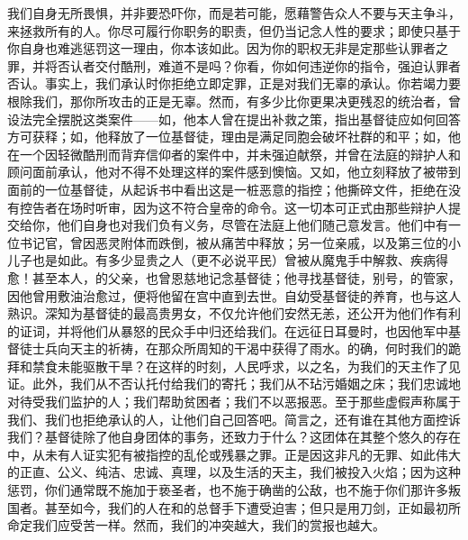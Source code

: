我们自身无所畏惧，并非要恐吓你，而是若可能，愿藉警告众人不要与天主争斗，来拯救所有的人。你尽可履行你职务的职责，但仍当记念人性的要求；即使只基于你自身也难逃惩罚这一理由，你本该如此。因为你的职权无非是定那些认罪者之罪，并将否认者交付酷刑，难道不是吗？你看，你如何违逆你的指令，强迫认罪者否认。事实上，我们承认时你拒绝立即定罪，正是对我们无辜的承认。你若竭力要根除我们，那你所攻击的正是无辜。然而，有多少比你更果决更残忍的统治者，曾设法完全摆脱这类案件——如，他本人曾在提出补救之策，指出基督徒应如何回答方可获释；如，他释放了一位基督徒，理由是满足同胞会破坏社群的和平；如，他在一个因轻微酷刑而背弃信仰者的案件中，并未强迫献祭，并曾在法庭的辩护人和顾问面前承认，他对不得不处理这样的案件感到懊恼。又如，他立刻释放了被带到面前的一位基督徒，从起诉书中看出这是一桩恶意的指控；他撕碎文件，拒绝在没有控告者在场时听审，因为这不符合皇帝的命令。这一切本可正式由那些辩护人提交给你，他们自身也对我们负有义务，尽管在法庭上他们随己意发言。他们中有一位书记官，曾因恶灵附体而跌倒，被从痛苦中释放；另一位亲戚，以及第三位的小儿子也是如此。有多少显贵之人（更不必说平民）曾被从魔鬼手中解救、疾病得愈！甚至本人，的父亲，也曾恩慈地记念基督徒；他寻找基督徒，别号，的管家，因他曾用敷油治愈过，便将他留在宫中直到去世。自幼受基督徒的养育，也与这人熟识。深知为基督徒的最高贵男女，不仅允许他们安然无恙，还公开为他们作有利的证词，并将他们从暴怒的民众手中归还给我们。在远征日耳曼时，也因他军中基督徒士兵向天主的祈祷，在那众所周知的干渴中获得了雨水。的确，何时我们的跪拜和禁食未能驱散干旱？在这样的时刻，人民呼求，以之名，为我们的天主作了见证。此外，我们从不否认托付给我们的寄托；我们从不玷污婚姻之床；我们忠诚地对待受我们监护的人；我们帮助贫困者；我们不以恶报恶。至于那些虚假声称属于我们、我们也拒绝承认的人，让他们自己回答吧。简言之，还有谁在其他方面控诉我们？基督徒除了他自身团体的事务，还致力于什么？这团体在其整个悠久的存在中，从未有人证实犯有被指控的乱伦或残暴之罪。正是因这非凡的无罪、如此伟大的正直、公义、纯洁、忠诚、真理，以及生活的天主，我们被投入火焰；因为这种惩罚，你们通常既不施加于亵圣者，也不施于确凿的公敌，也不施于你们那许多叛国者。甚至如今，我们的人在和的总督手下遭受迫害；但只是用刀剑，正如最初所命定我们应受苦一样。然而，我们的冲突越大，我们的赏报也越大。\par


